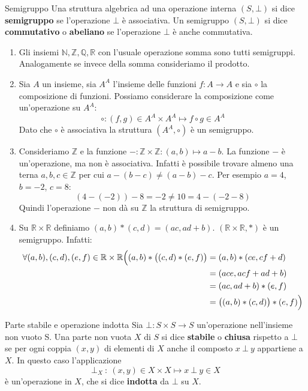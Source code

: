 \begin{defbox}{Semigruppo}
	Una struttura algebrica ad una operazione interna $(S, \bot)$ si dice \textbf{semigruppo} se l'operazione $\bot$ è associativa. Un semigruppo $(S,\bot)$ si dice \textbf{commutativo} o \textbf{abeliano} se l'operazione $\bot$ è anche commutativa.
\end{defbox}

\begin{example}
\begin{enumerate}
	\item Gli insiemi $\mathbb{N},\mathbb{Z},\mathbb{Q},\mathbb{R}$ con l'usuale operazione somma sono tutti semigruppi. Analogamente se invece della somma consideriamo il prodotto.

	\item Sia $A$ un insieme, sia $A^{A}$ l'insieme delle funzioni $f:A \rightarrow A$ e sia $\circ$ la composizione di funzioni. Possiamo considerare la composizione come un'operazione su $A^{A}$:
	\begin{displaymath}
		\circ : (f,g) \in A^{A} \times A^{A} \mapsto f \circ g \in A^{A}
	\end{displaymath}
	Dato che $\circ$ è associativa la struttura $(A^{A},\circ)$ è un semigruppo.
	\item Consideriamo $\mathbb{Z}$ e la funzione $-: \mathbb{Z} \times \mathbb{Z}: (a,b) \mapsto a-b$. La funzione $-$ è un'operazione, ma non è associativa. Infatti è possibile trovare almeno una terna $a,b,c \in \mathbb{Z}$ per cui $a-(b-c)\neq (a-b)-c$. Per esempio $a=4$, $b=-2$, $c=8$:
	\[(4-(-2))-8=-2 \neq 10=4-(-2-8)\]
	Quindi l'operazione $-$ non dà su $\mathbb{Z}$ la struttura di semigruppo.
	\item Su $\mathbb{R} \times \mathbb{R}$ definiamo $(a,b) \ast (c,d)=(ac,ad+b)$. $(\mathbb{R}\times \mathbb{R},\ast)$ è un semigruppo. Infatti:
	\begin{align*}
		\forall (a,b),(c,d),(e,f) \in \mathbb{R}\times\mathbb{R}\Bigl((a,b)\ast \bigl((c,d) \ast (e,f)\bigr) &= (a,b) \ast (ce,cf+d) \\
		&= (ace, acf+ad+b) \\
		&= (ac,ad+b) \ast (e,f) \\
		&= \bigl((a,b)\ast(c,d)\bigr)\ast (e,f)\Bigr)
	\end{align*}
\end{enumerate}
\end{example}

\begin{defbox}{Parte stabile e operazione indotta}
	Sia $\bot: S \times S \longrightarrow S$ un'operazione nell'insieme non vuoto S. Una parte non vuota $X$ di $S$ si dice \textbf{stabile} o \textbf{chiusa} rispetto a $\bot$ se per ogni coppia $(x,y)$ di elementi di $X$ anche il composto $x\: \bot \: y$ appartiene a $X$. In questo caso l'applicazione
	\begin{displaymath}
		\bot_{X}\: : \:(x,y)\in X \times X \longmapsto x \: \bot \: y \in X
	\end{displaymath}
	è un'operazione in $X$, che si dice \textbf{indotta} da $\bot$ su $X$.
\end{defbox}

